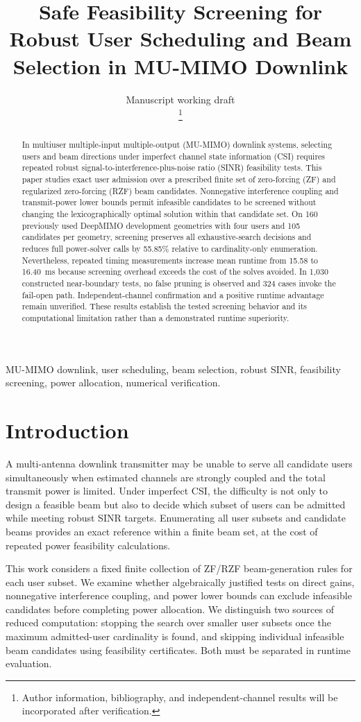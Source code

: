 \documentclass[journal]{IEEEtran}
\title{Safe Feasibility Screening for Robust User Scheduling and Beam Selection in MU-MIMO Downlink}
\author{Manuscript working draft\\\thanks{Author information, bibliography, and independent-channel results will be incorporated after verification.}}
\begin{document}
\maketitle
\begin{abstract}
In multiuser multiple-input multiple-output (MU-MIMO) downlink systems, selecting users and beam directions under imperfect channel state information (CSI) requires repeated robust signal-to-interference-plus-noise ratio (SINR) feasibility tests. This paper studies exact user admission over a prescribed finite set of zero-forcing (ZF) and regularized zero-forcing (RZF) beam candidates. Nonnegative interference coupling and transmit-power lower bounds permit infeasible candidates to be screened without changing the lexicographically optimal solution within that candidate set. On 160 previously used DeepMIMO development geometries with four users and 105 candidates per geometry, screening preserves all exhaustive-search decisions and reduces full power-solver calls by 55.85\% relative to cardinality-only enumeration. Nevertheless, repeated timing measurements increase mean runtime from 15.58 to 16.40~ms because screening overhead exceeds the cost of the solves avoided. In 1,030 constructed near-boundary tests, no false pruning is observed and 324 cases invoke the fail-open path. Independent-channel confirmation and a positive runtime advantage remain unverified. These results establish the tested screening behavior and its computational limitation rather than a demonstrated runtime superiority.
\end{abstract}
\begin{IEEEkeywords}
MU-MIMO downlink, user scheduling, beam selection, robust SINR, feasibility screening, power allocation, numerical verification.
\end{IEEEkeywords}
\section{Introduction}
A multi-antenna downlink transmitter may be unable to serve all candidate users simultaneously when estimated channels are strongly coupled and the total transmit power is limited. Under imperfect CSI, the difficulty is not only to design a feasible beam but also to decide which subset of users can be admitted while meeting robust SINR targets. Enumerating all user subsets and candidate beams provides an exact reference within a finite beam set, at the cost of repeated power feasibility calculations.

This work considers a fixed finite collection of ZF/RZF beam-generation rules for each user subset. We examine whether algebraically justified tests on direct gains, nonnegative interference coupling, and power lower bounds can exclude infeasible candidates before completing power allocation. We distinguish two sources of reduced computation: stopping the search over smaller user subsets once the maximum admitted-user cardinality is found, and skipping individual infeasible beam candidates using feasibility certificates. Both must be separated in runtime evaluation.
\end{document}
